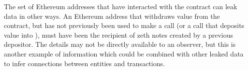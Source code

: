 The set of Ethereum addresses that have interacted with the contract can leak data in other ways. An Ethereum address that withdraws value from the contract, but has not previously been used to make a \mix{} call (or a \mix{} call that deposits value into \mixer), must have been the recipient of zeth notes created by a previous depositor. The details may not be directly available to an observer, but this is another example of information which could be combined with other leaked data to infer connections between entities and transactions.
